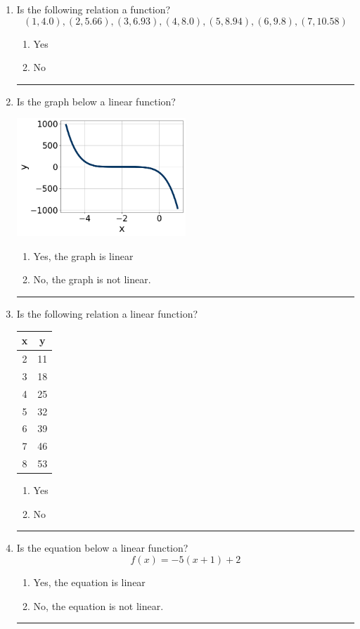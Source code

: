 \documentclass[14pt]{extbook}
\newcommand{\litem}[1]{\item#1\hspace*{-1cm}\rule{\textwidth}{0.4pt}}
\begin{document}
\begin{enumerate}
\litem{
Is the following relation a function?\[ (1, 4.0), (2, 5.66), (3, 6.93), (4, 8.0), (5, 8.94), (6, 9.8), (7, 10.58) \]\begin{enumerate}[label=\Alph*.]
\item Yes
\item No

\end{enumerate} }
\litem{
Is the graph below a linear function?
\begin{center}
    \includegraphics[width=0.5\textwidth]{../Figures/MA_8_F_1_2_graphC.png}
\end{center}
\begin{enumerate}[label=\Alph*.]
\item Yes, the graph is linear
\item No, the graph is not linear.

\end{enumerate} }
\litem{
Is the following relation a linear function?

\begin{tabular}{c|c}
x &y\tabularnewline \hline
2 &11\tabularnewline \hline
3 &18\tabularnewline \hline
4 &25\tabularnewline \hline
5 &32\tabularnewline \hline
6 &39\tabularnewline \hline
7 &46\tabularnewline \hline
8 &53\end{tabular}\begin{enumerate}[label=\Alph*.]
\item Yes
\item No

\end{enumerate} }
\litem{
Is the equation below a linear function?\[ f(x) = -5(x + 1)+2 \]\begin{enumerate}[label=\Alph*.]
\item Yes, the equation is linear
\item No, the equation is not linear.

\end{enumerate} }
\end{enumerate}
\end{document}
